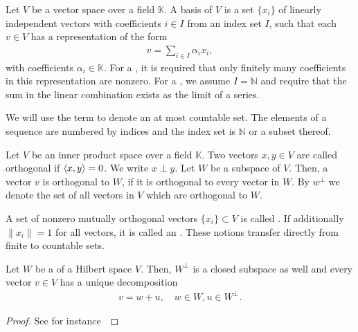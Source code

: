 \begin{definition}
  Let $V$ be a vector space over a field $\mathbb K$. A basis of $V$
  is a set $\{x_i\}$ of linearly independent vectors with coefficients
  $i\in I$ from an index set $I$, such that each $v\in V$ has a
  representation of the form
  \begin{gather*}
    v = \sum_{i\in I} \alpha_i x_i,
  \end{gather*}
  with coefficients $\alpha_i \in \mathbb K$. For a , it is required that only finitely many coefficients in
  this representation are nonzero. For a , we
  assume $I = \mathbb N$ and require that the sum in the linear
  combination exists as the limit of a series.
\end{definition}

\begin{notation}
  We will use the term  to denote an at most
  countable set. The elements of a sequence are numbered by indices
  and the index set is $\mathbb N$ or a subset thereof.
\end{notation}

\begin{definition}
  Let $V$ be an inner product space over a field $\mathbb K$. Two
  vectors $x,y\in V$ are called orthogonal if $\scal(x,y) = 0$. We
  write $x\perp y$. Let $W$ be a subspace of $V$. Then, a vector $v$
  is orthogonal to $W$, if it is orthogonal to every vector in $W$. By
  $w^\perp$ we denote the set of all vectors in $V$ which are
  orthogonal to $W$.

  A set of nonzero mutually orthogonal vectors
  $\{x_i\} \subset V$ is called . If
  additionally $\|x_i\| = 1$ for all vectors, it is called an
  . These notions transfer directly from
  finite to countable sets.
\end{definition}

\begin{theorem}
  Let $W$ be a  of a Hilbert space $V$. Then,
  $W^\perp$ is a closed subspace as well and every vector $v\in V$ has
  a unique decomposition
  \begin{gather}
    \label{eq:lafa:1}
    v = w + u, \quad w\in W, u\in W^\perp.
  \end{gather}
\end{theorem}

\begin{todo}
  \begin{proof}
    See for instance~\cite[p. 82]{Yosida80}
  \end{proof}
\end{todo}

